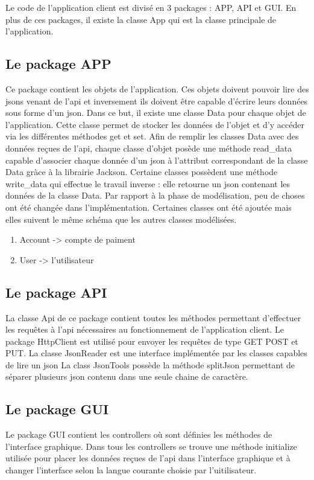 \documentclass[../rapport.tex]{subfiles}
\begin{document}
Le code de l'application client est divisé en 3 packages : APP, API et GUI.
En plus de ces packages, il existe la classe App qui est la classe principale de l'application. 

\subsection{Le package APP}
Ce package contient les objets de l'application. Ces objets doivent pouvoir lire des jsons venant de l'api et inversement ils doivent être capable
d'écrire leurs données sous forme d'un json. Dans ce but, il existe une classe Data pour chaque objet de l'application. Cette classe permet de stocker 
les données de l'objet et d'y accéder via les différentes méthodes get et set. 
Afin de remplir les classes Data avec des données reçues de l'api, chaque classe d'objet posède une méthode read\_data capable d'associer
chaque donnée d'un json à l'attribut correspondant de la classe Data gràce à la librairie Jackson.  
Certaine classes possèdent une méthode write\_data qui effectue le travail inverse : elle retourne un json contenant les données de la classe Data.
Par rapport à la phase de modélisation, peu de choses ont été changée dans l'implémentation. Certaines classes ont été ajoutée mais elles suivent le même schéma que 
les autres classes modélisées.

\begin{enumerate}
\item Account -> compte de paiment
\item User -> l'utilisateur
\end{enumerate}

\subsection{Le package API}
La classe Api de ce package contient toutes les méthodes permettant d'effectuer les requêtes à l'api nécessaires au fonctionnement de l'application client.
Le package HttpClient est utilisé pour envoyer les requêtes de type GET POST et PUT.
La classe JsonReader est une interface implémentée par les classes capables de lire un json
La class JsonTools possède la méthode splitJson permettant de séparer plusieurs json contenu dans une seule chaine de caractère.

\subsection{Le package GUI}
Le package GUI contient les controllers où sont définies les méthodes de l'interface graphique. 
Dans tous les controllers se trouve une méthode initialize utilisée pour placer les données reçues de l'api dans l'interface graphique et à changer l'interface
selon la langue courante choisie par l'uitilisateur.
\end{document}
